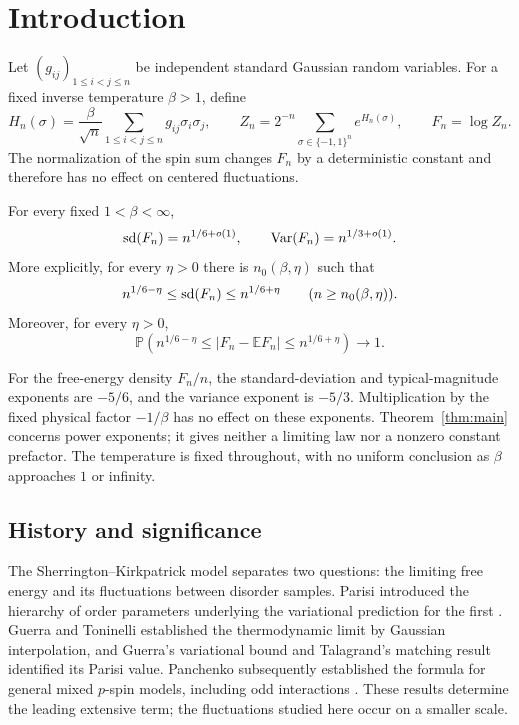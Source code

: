 \section{Introduction}\label{sec:introduction}
Let $(g_{ij})_{1\le i<j\le n}$ be independent standard Gaussian random variables. For a fixed inverse temperature $\beta>1$, define
\[
 H_n(\sigma)=\frac{\beta}{\sqrt n}\sum_{1\le i<j\le n}g_{ij}\sigma_i\sigma_j,
 \qquad Z_n=2^{-n}\sum_{\sigma\in\{-1,1\}^n}e^{H_n(\sigma)},
 \qquad F_n=\log Z_n.
\]
The normalization of the spin sum changes $F_n$ by a deterministic constant and therefore has no effect on centered fluctuations.

\begin{theorem}\label{thm:main}
For every fixed $1<\beta<\infty$,
\[
 \operatorname{sd}(F_n)=n^{1/6+o(1)},\qquad \operatorname{Var}(F_n)=n^{1/3+o(1)}.
\]
More explicitly, for every $\eta>0$ there is $n_0(\beta,\eta)$ such that
\[
 n^{1/6-\eta}\le\operatorname{sd}(F_n)\le n^{1/6+\eta}
 \qquad(n\ge n_0(\beta,\eta)).
\]
Moreover, for every $\eta>0$,
\[
 \mathbb P\!\left(n^{1/6-\eta}\le|F_n-\mathbb EF_n|
                         \le n^{1/6+\eta}\right)\longrightarrow1.
\]
\end{theorem}
For the free-energy density $F_n/n$, the standard-deviation and typical-magnitude exponents are $-5/6$, and the variance exponent is $-5/3$. Multiplication by the fixed physical factor $-1/\beta$ has no effect on these exponents. Theorem~\ref{thm:main} concerns power exponents; it gives neither a limiting law nor a nonzero constant prefactor. The temperature is fixed throughout, with no uniform conclusion as $\beta$ approaches $1$ or infinity.

\subsection{History and significance}
The Sherrington--Kirkpatrick model \cite{SK1975} separates two questions:
the limiting free energy and its fluctuations between disorder samples.
Parisi introduced the hierarchy of order parameters underlying the
variational prediction for the first \cite{Parisi1979}.
Guerra and Toninelli \cite{GuerraToninelli2002} established the
thermodynamic limit by Gaussian interpolation, and Guerra's variational
bound \cite{Guerra2003} and Talagrand's matching result
\cite{Talagrand2006} identified its Parisi value. Panchenko subsequently
established the formula for general mixed $p$-spin models, including odd
interactions \cite{Panchenko2014}. These results determine the leading
extensive term; the fluctuations studied here occur on a smaller scale.


